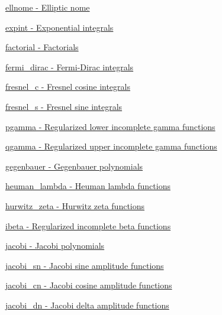 \begin{DoxyItemize}
\item \hyperlink{group__gnu__math__spec__func_ga7bfb34f8b5c0ed7c72040f9cb7034bba}{ellnome -\/ Elliptic nome}
\item \hyperlink{group__gnu__math__spec__func_ga2cfc699129ceac9cfed87c61e6dc0e08}{expint -\/ Exponential integrals}
\item \hyperlink{group__gnu__math__spec__func_ga48bc268969bfc03eaeaf4bfd457bb25c}{factorial -\/ Factorials}
\item \hyperlink{group__gnu__math__spec__func_ga47dd583a4f3a19f797a5e074e357ba36}{fermi\+\_\+dirac -\/ Fermi-\/\+Dirac integrals}
\item \hyperlink{group__gnu__math__spec__func_gab6a34ce43bad4e8181ad9c40aebb9ada}{fresnel\+\_\+c -\/ Fresnel cosine integrals}
\item \hyperlink{group__gnu__math__spec__func_gaaf6e2b182d0abde6fde72c0b8b9f959c}{fresnel\+\_\+s -\/ Fresnel sine integrals}
\item \hyperlink{group__gnu__math__spec__func_gaa78927de2c62e6c63f4b3506f5e1a8f6}{pgamma -\/ Regularized lower incomplete gamma functions}
\item \hyperlink{group__gnu__math__spec__func_ga3ef7aeaa55f9e7b02f02d1d605a716a6}{qgamma -\/ Regularized upper incomplete gamma functions}
\item \hyperlink{group__gnu__math__spec__func_ga793df814fb4e1b60e926ead0be14cc87}{gegenbauer -\/ Gegenbauer polynomials}
\item \hyperlink{group__gnu__math__spec__func_gab73b2a75a662785fa102926dca3be59f}{heuman\+\_\+lambda -\/ Heuman lambda functions}
\item \hyperlink{group__gnu__math__spec__func_ga19b3014d94dd102c59a5c7776474be41}{hurwitz\+\_\+zeta -\/ Hurwitz zeta functions}
\item \hyperlink{group__gnu__math__spec__func_gae9a18423e325171ca0c61b411258fa65}{ibeta -\/ Regularized incomplete beta functions}
\item \hyperlink{group__gnu__math__spec__func_ga3dea9ec3774ee5db50276597bbfb0afa}{jacobi -\/ Jacobi polynomials}
\item \hyperlink{group__gnu__math__spec__func_ga5e39ec723669e132e27980dfdf766c19}{jacobi\+\_\+sn -\/ Jacobi sine amplitude functions}
\item \hyperlink{group__gnu__math__spec__func_ga51512996a910489b4554daa7507a48f1}{jacobi\+\_\+cn -\/ Jacobi cosine amplitude functions}
\item \hyperlink{group__gnu__math__spec__func_ga4c2e5ff17abaab5217d4dbcbfd7366d8}{jacobi\+\_\+dn -\/ Jacobi delta amplitude functions}

\end{DoxyItemize}
